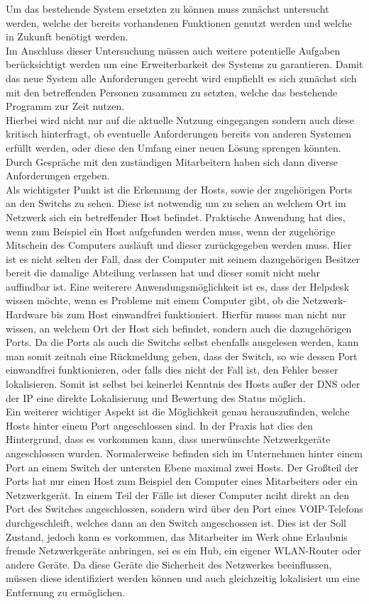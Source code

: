 Um das bestehende System ersetzten zu können muss zunächst untersucht werden, welche der bereits vorhandenen Funktionen genutzt werden und welche in Zukunft benötigt werden.\\
Im Anschluss dieser Untersuchung müssen auch weitere potentielle Aufgaben berücksichtigt werden um eine Erweiterbarkeit des Systems zu garantieren. Damit das neue System alle Anforderungen gerecht wird empfiehlt es sich zunächst sich mit den betreffenden Personen zusammen zu setzten, welche das bestehende Programm zur Zeit nutzen.\\
Hierbei wird nicht nur auf die aktuelle Nutzung eingegangen sondern auch diese kritisch hinterfragt, ob eventuelle Anforderungen bereits von anderen Systemen erfüllt werden, oder diese den Umfang einer neuen Lösung sprengen könnten.\\
Durch Gespräche mit den zuständigen Mitarbeitern haben sich dann diverse Anforderungen ergeben.\\
Als wichtigster Punkt ist die Erkennung der Hosts, sowie der zugehörigen Ports an den Switchs zu sehen. Diese ist notwendig um zu sehen an welchem Ort im Netzwerk sich ein betreffender Host befindet. Praktische Anwendung hat dies, wenn zum Beispiel ein Host aufgefunden werden muss, wenn der zugehörige Mitschein des Computers ausläuft und dieser zurückgegeben werden muss. Hier ist es nicht selten der Fall, dass der Computer mit seinem dazugehörigen Besitzer bereit die damalige Abteilung verlassen hat und dieser somit nicht mehr auffindbar ist. Eine weiterere Anwendungsmöglichkeit ist es, dass der Helpdesk wissen möchte, wenn es Probleme mit einem Computer gibt, ob die Netzwerk-Hardware bis zum Host einwandfrei funktioniert. Hierfür musss man nicht nur wissen, an welchem Ort der Host sich befindet, sondern auch die dazugehörigen Ports. Da die Ports als auch die Switchs selbst ebenfalls ausgelesen werden, kann man somit zeitnah eine Rückmeldung geben, dass der Switch, so wie dessen Port einwandfrei funktionieren, oder falls dies nicht der Fall ist, den Fehler besser lokalisieren. Somit ist selbst bei keinerlei Kenntnis des Hosts außer der DNS oder der IP eine direkte Lokalisierung und Bewertung des Status möglich.\\
Ein weiterer wichtiger Aspekt ist die Möglichkeit genau herauszufinden, welche Hosts hinter einem Port angeschlossen sind. In der Praxis hat dies den Hintergrund, dass es vorkommen kann, dass unerwünschte Netzwerkgeräte angeschlossen wurden. Normalerweise befinden sich im Unternehmen hinter einem Port an einem Switch der untersten Ebene maximal zwei Hosts. Der Großteil der Ports hat nur einen Host zum Beispiel den Computer eines Mitarbeiters oder ein Netzwerkgerät. In einem Teil der Fälle ist dieser Computer nciht direkt an den Port des Switches angeschlossen, sondern wird über den Port eines VOIP-Telefons durchgeschleift, welches dann an den Switch angeschossen ist. Dies ist der Soll Zustand, jedoch kann es vorkommen, das Mitarbeiter im Werk ohne Erlaubnis fremde Netzwerkgeräte anbringen, sei es ein Hub, ein eigener WLAN-Router oder andere Geräte. Da diese Geräte die Sicherheit des Netzwerkes beeinflussen, müssen diese identifiziert werden können und auch gleichzeitig lokalisiert um eine Entfernung zu ermöglichen.
